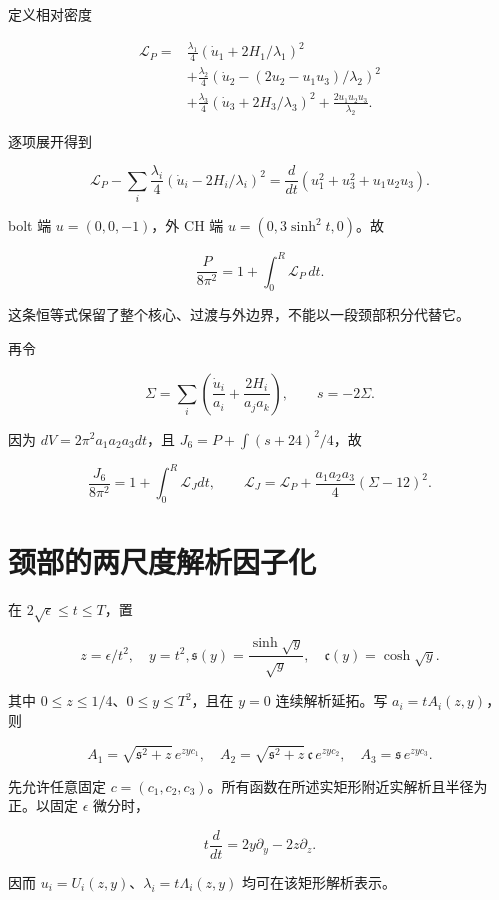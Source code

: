 \documentclass[UTF8,11pt,openany,fontset=none]{ctexbook}
\theoremstyle{definition}
\theoremstyle{remark}
\begin{document}
定义相对密度

\[
\begin{aligned}
\mathscr L_P={}&\frac{\lambda_1}{4}
(\dot u_1+2H_1/\lambda_1)^2\\
&+\frac{\lambda_2}{4}
(\dot u_2-(2u_2-u_1u_3)/\lambda_2)^2\\
&+\frac{\lambda_3}{4}
(\dot u_3+2H_3/\lambda_3)^2
+\frac{2u_1u_2u_3}{\lambda_2}.
\end{aligned}
\]

逐项展开得到

\[
 \mathscr L_P-\sum_i\frac{\lambda_i}{4}
 (\dot u_i-2H_i/\lambda_i)^2
 =\frac d{dt}(u_1^2+u_3^2+u_1u_2u_3).
\]

bolt 端 \(u=(0,0,-1)\)，外 CH 端 \(u=(0,3\sinh ^2t,0)\)。故

\[
\boxed{\frac{P}{8\pi^2}=1+\int_0^R\mathscr L_P\,dt.}
\tag{5.2.2}
\]

这条恒等式保留了整个核心、过渡与外边界，不能以一段颈部积分代替它。

再令

\[
 \Sigma=\sum_i\left(\frac{\dot u_i}{a_i}
 +\frac{2H_i}{a_ja_k}\right),\qquad s=-2\Sigma.
\]

因为 \(dV=2\pi ^2a_1a_2a_3dt\)，且 \(J_6=P+\int (s+24)^2/4\)，故

\[
 \frac{J_6}{8\pi^2}
 =1+\int_0^R\mathscr L_Jdt,\qquad
 \mathscr L_J=\mathscr L_P+
 \frac{a_1a_2a_3}{4}(\Sigma-12)^2.
\tag{5.2.3}
\]

\section{颈部的两尺度解析因子化}\label{v5-ux9888ux90e8ux7684ux4e24ux5c3aux5ea6ux89e3ux6790ux56e0ux5b50ux5316}

在 \(2\sqrt{\epsilon }\le t\le T\)，置

\[
 z=\epsilon/t^2,\quad y=t^2,
 \mathfrak s(y)=\frac{\sinh\sqrt y}{\sqrt y},\quad
 \mathfrak c(y)=\cosh\sqrt y.
\]

其中 \(0\le z\le 1/4\)、\(0\le y\le T^2\)，且在 \(y=0\) 连续解析延拓。写 \(a_i=t A_i(z,y)\)，则

\[
 A_1=\sqrt{\mathfrak s^2+z}\,e^{zyc_1},\quad
 A_2=\sqrt{\mathfrak s^2+z}\,\mathfrak c\,e^{zyc_2},\quad
 A_3=\mathfrak s\,e^{zyc_3}.
\]

先允许任意固定 \(c=(c_1,c_2,c_3)\)。所有函数在所述实矩形附近实解析且半径为正。以固定 \(\epsilon\) 微分时，

\[
 t\frac d{dt}=2y\partial_y-2z\partial_z.
\]

因而 \(u_i=U_i(z,y)\)、\(\lambda _i=t\Lambda _i(z,y)\) 均可在该矩形解析表示。
\end{document}
